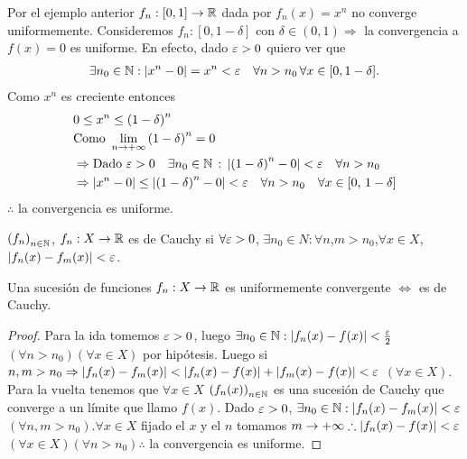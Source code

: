 \begin{eg}
  Por el ejemplo anterior \(f_n: [0, 1] \to \mathbb{R} \) dada por \(f_n(x) = x^n\) no converge uniformemente.
  Consideremos \(f_n: [0, 1 - \delta]\) con \(\delta \in (0, 1) \Rightarrow \) la convergencia a \(f(x) = 0\) es uniforme.
  En efecto, dado \(\varepsilon > 0\) quiero ver que
  \begin{align*}
    \exists n_0 \in \mathbb{N} : |x^n - 0| = x^n < \varepsilon \quad \forall n > n_0 \, \forall x \in [0, 1 - \delta].
  \end{align*}
  Como \(x^n\) es creciente entonces
  \begin{align*}
     & 0 \leq x^n \leq {(1 - \delta)}^n                                                                                      \\
     & \text{Como } \lim_{n \to +\infty} {(1 - \delta)}^n = 0                                                                \\
     & \Rightarrow \text{Dado } \varepsilon > 0 \quad \exists n_0 \in \mathbb{N} \, : \, |{(1 - \delta)}^n - 0 | < \varepsilon \quad \forall n > n_0   \\
     & \Rightarrow |x^n - 0| \leq |{(1 - \delta)}^n - 0| < \varepsilon \quad \forall n > n_0 \quad \forall x \in [0\text{, }1-\delta]
  \end{align*}
  \(\therefore \) la convergencia es uniforme.
\end{eg}

\begin{definition}
  \({(f_n)}_{n \in \mathbb{N}} \), \(f_n: X \to \mathbb{R} \) es de Cauchy si \( \forall \varepsilon > 0 \), \(\exists n_0 \in N : \forall n\),\(m > n_0\),\(\forall x \in X\), \(|f_n(x) - f_m(x)| < \varepsilon \).
\end{definition}

\begin{theorem}
  Una sucesión de funciones \(f_n : X \to \mathbb{R} \) es uniformemente convergente \(\iff \) es de Cauchy.
  \begin{proof}
    Para la ida tomemos \(\varepsilon > 0\), luego \(\exists n_0 \in \mathbb{N} : |f_n(x) - f(x)| < \frac{\varepsilon}{2} \) \((\forall n > n_0)(\forall x \in X)\) por hipótesis. Luego si \(n, m > n_0 \Rightarrow |f_n(x) - f_m(x)| < |f_n(x) - f(x)| + |f_m(x) - f(x)| < \varepsilon \) \((\forall x \in X)\). \\
    Para la vuelta tenemos que \(\forall x \in X\) \({(f_n(x))}_{n \in \mathbb{N}} \) es una sucesión de Cauchy que converge a un límite que llamo \(f(x)\). Dado \(\varepsilon > 0\), \(\exists n_0 \in \mathbb{N} : |f_n(x) - f_m(x)| < \varepsilon \) \((\forall n, m > n_0)\).\(\forall x \in X\) fijado el \(x\) y el \(n\) tomamos \(m \to +\infty \therefore |f_n(x) - f(x)| < \varepsilon \) \((\forall x \in X)(\forall n > n_0) \therefore \) la convergencia es uniforme.
  \end{proof}
\end{theorem}

